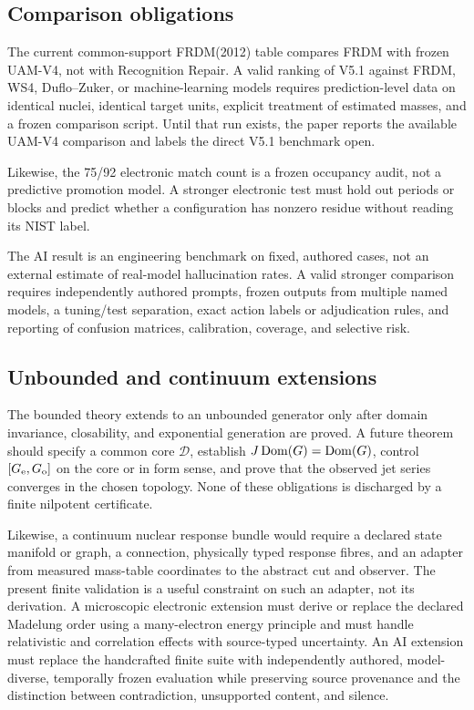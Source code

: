 \subsection{Comparison obligations}

The current common-support FRDM(2012) table compares FRDM with frozen UAM-V4, not with Recognition Repair. A valid ranking of V5.1 against FRDM, WS4, Duflo--Zuker, or machine-learning models requires prediction-level data on identical nuclei, identical target units, explicit treatment of estimated masses, and a frozen comparison script. Until that run exists, the paper reports the available UAM-V4 comparison and labels the direct V5.1 benchmark open.

Likewise, the 75/92 electronic match count is a frozen occupancy audit, not a predictive promotion model. A stronger electronic test must hold out periods or blocks and predict whether a configuration has nonzero residue without reading its NIST label.

The AI result is an engineering benchmark on fixed, authored cases, not an external estimate of real-model hallucination rates. A valid stronger comparison requires independently authored prompts, frozen outputs from multiple named models, a tuning/test separation, exact action labels or adjudication rules, and reporting of confusion matrices, calibration, coverage, and selective risk.

\subsection{Unbounded and continuum extensions}

The bounded theory extends to an unbounded generator only after domain invariance, closability, and exponential generation are proved. A future theorem should specify a common core $\mathcal D$, establish $J\operatorname{Dom}(G)=\operatorname{Dom}(G)$, control $[G_{\mathrm e},G_{\mathrm o}]$ on the core or in form sense, and prove that the observed jet series converges in the chosen topology. None of these obligations is discharged by a finite nilpotent certificate.

Likewise, a continuum nuclear response bundle would require a declared state manifold or graph, a connection, physically typed response fibres, and an adapter from measured mass-table coordinates to the abstract cut and observer. The present finite validation is a useful constraint on such an adapter, not its derivation. A microscopic electronic extension must derive or replace the declared Madelung order using a many-electron energy principle and must handle relativistic and correlation effects with source-typed uncertainty. An AI extension must replace the handcrafted finite suite with independently authored, model-diverse, temporally frozen evaluation while preserving source provenance and the distinction between contradiction, unsupported content, and silence.
